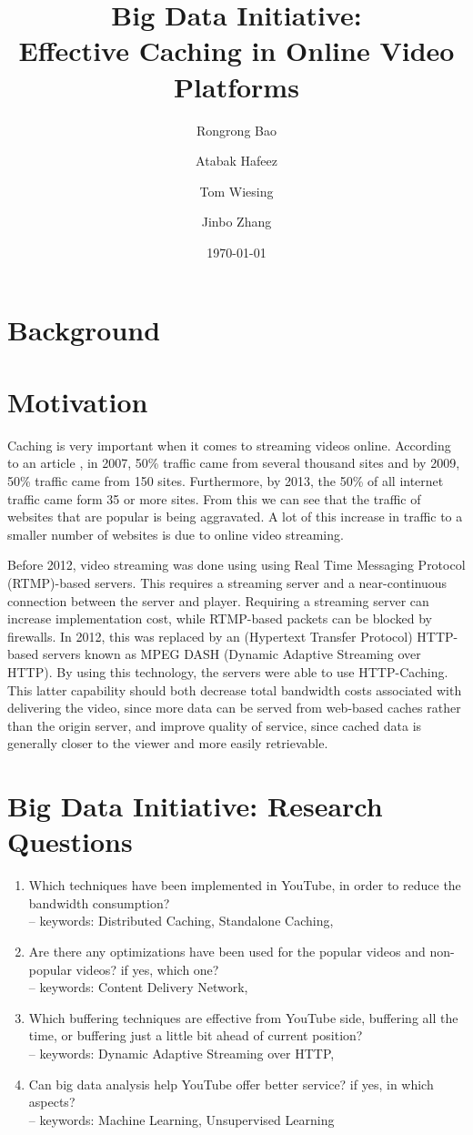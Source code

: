 \documentclass[a4paper,10pt]{article}
\title{Big Data Initiative:\\Effective Caching in Online Video Platforms}
\author{Rongrong Bao \and Atabak Hafeez \and Tom Wiesing \and Jinbo Zhang}
\date{\today}
\begin{document}
\maketitle

\section{Background}
\section{Motivation}
Caching is very important when it comes to streaming videos online. According to an article \cite{OnlineVideoBandwagon}, in 2007, 50\% traffic came from several thousand sites and by 2009, 50\% traffic came from 150 sites. Furthermore, by 2013, the 50\% of all internet traffic came form 35 or more sites. From this we can see that the traffic of websites that are popular is being aggravated. A lot of this increase in traffic to a smaller number of websites is due to online video streaming.

Before 2012, video streaming was done using using Real Time Messaging Protocol (RTMP)-based servers. This requires a streaming server and a near-continuous connection between the server and player. Requiring a streaming server can increase implementation cost, while RTMP-based packets can be blocked by firewalls. In 2012, this was replaced by an (Hypertext Transfer Protocol) HTTP-based servers known as MPEG DASH (Dynamic Adaptive Streaming over HTTP).  By using this technology, the servers were able to use HTTP-Caching. This latter capability should both decrease total bandwidth costs associated with delivering the video, since more data can be served from web-based caches rather than the origin server, and improve quality of service, since cached data is generally closer to the viewer and more easily retrievable.
\section{Big Data Initiative: Research Questions}
\begin{enumerate}
\item Which techniques have been implemented in YouTube, in order to reduce the bandwidth consumption?\\
-- keywords: Distributed Caching, Standalone Caching,
\item Are there any optimizations have been used for the popular videos and non-popular videos? if yes, which one?\\
-- keywords: Content Delivery Network,
\item Which buffering techniques are effective from YouTube side, buffering all the time, or buffering just a little bit ahead of current position?\\
-- keywords: Dynamic Adaptive Streaming over HTTP,
\item Can big data analysis help YouTube offer better service? if yes, in which aspects?\\
-- keywords: Machine Learning, Unsupervised Learning
\end{enumerate}
\end{document}
